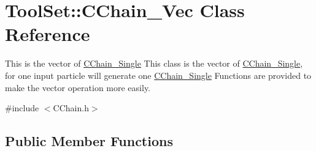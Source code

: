 \hypertarget{classToolSet_1_1CChain__Vec}{
\section{ToolSet::CChain\_\-Vec Class Reference}
\label{classToolSet_1_1CChain__Vec}
}


This is the vector of \hyperlink{classToolSet_1_1CChain__Single}{CChain\_\-Single} This class is the vector of \hyperlink{classToolSet_1_1CChain__Single}{CChain\_\-Single}, for one input particle will generate one \hyperlink{classToolSet_1_1CChain__Single}{CChain\_\-Single} Functions are provided to make the vector operation more easily.  


{\ttfamily \#include $<$CChain.h$>$}\subsection*{Public Member Functions}
